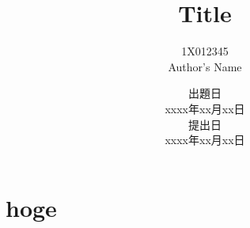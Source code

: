 \documentclass[titlepage, 11pt, a4j]{jsarticle}
\begin{document}
 

\title{Title}
\author{1X012345 \\ Author's Name}
\date{出題日 \\ xxxx年xx月xx日 \\ 提出日\\ xxxx年xx月xx日}
\maketitle

\renewcommand{\thefigure}{\thesection.\arabic{figure}} %
\renewcommand{\thetable}{\thesection.\arabic{table}} %
\renewcommand{\theequation}{\thesection.\arabic{equation}} %
\renewcommand{\thelstlisting}{\thesection.\arabic{lstlisting}} %

\section{hoge}
\setcounter{figure}{0}
\setcounter{table}{0}
\setcounter{equation}{0}
\setcounter{lstlisting}{0}
\end{document}
